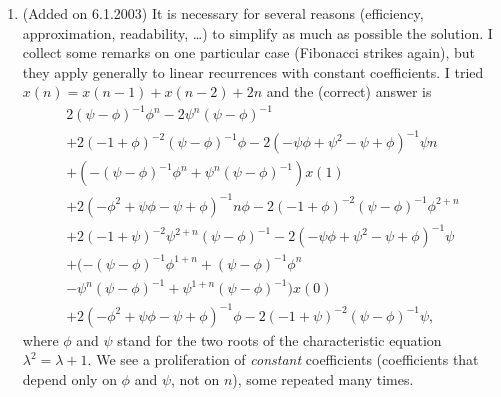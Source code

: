 \documentclass[a4paper]{article}
\begin{document}
\begin{enumerate}
\item (Added on 6.1.2003)
It is necessary for several reasons (efficiency, approximation,
readability, \dots) to simplify as much as possible the solution.
I collect some remarks on one particular case (Fibonacci strikes
again), but they apply generally to linear recurrences with constant
coefficients.
I tried $x(n) = x(n-1) + x(n-2) + 2n$ and the (correct) answer is
%
\begin{multline*}
  2 (\psi-\phi)^{-1} \phi^n
  -
  2 \psi^n (\psi-\phi)^{-1} \\
  +
  2 (-1+\phi)^{-2} (\psi-\phi)^{-1} \phi 
  -
  2 (-\psi \phi+\psi^2
  -
  \psi+\phi)^{-1} \psi n \\
  +
  (-(\psi-\phi)^{-1} \phi^n
  +
  \psi^n (\psi-\phi)^{-1}) x(1) \\
  +
  2 (-\phi^2+\psi \phi-\psi+\phi)^{-1} n \phi
  -
  2 (-1+\phi)^{-2} (\psi-\phi)^{-1} \phi^{2+n} \\
  +
  2 (-1+\psi)^{-2} \psi^{2+n} (\psi-\phi)^{-1}
  -
  2 (-\psi \phi+\psi^2-\psi+\phi)^{-1} \psi \\
  +
  (-(\psi-\phi)^{-1} \phi^{1+n}
  +
  (\psi-\phi)^{-1} \phi^n \\
  -
  \psi^n (\psi-\phi)^{-1}
  +
  \psi^{1+n} (\psi-\phi)^{-1}) x(0) \\
  +
  2 (-\phi^2+\psi \phi-\psi+\phi)^{-1} \phi
  -
  2 (-1+\psi)^{-2} (\psi-\phi)^{-1} \psi,
\end{multline*}
where $\phi$ and $\psi$ stand for the two roots of the characteristic
equation $\lambda^2 = \lambda + 1$.
We see a proliferation of \emph{constant} coefficients (coefficients
that depend only on $\phi$ and $\psi$, not on $n$), some repeated many
times.


\end{enumerate}
\end{document}
